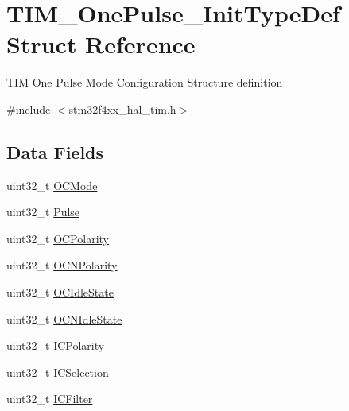 \hypertarget{struct_t_i_m___one_pulse___init_type_def}{}\section{T\+I\+M\+\_\+\+One\+Pulse\+\_\+\+Init\+Type\+Def Struct Reference}
\label{struct_t_i_m___one_pulse___init_type_def}


T\+IM One Pulse Mode Configuration Structure definition ~\newline
  




{\ttfamily \#include $<$stm32f4xx\+\_\+hal\+\_\+tim.\+h$>$}

\subsection*{Data Fields}
\begin{DoxyCompactItemize}
\item 
uint32\+\_\+t \mbox{\hyperlink{struct_t_i_m___one_pulse___init_type_def_add4ac9143086c89effbede5c54e958bf}{O\+C\+Mode}}
\item 
uint32\+\_\+t \mbox{\hyperlink{struct_t_i_m___one_pulse___init_type_def_a5251c3bce4ca5baf013bc0ace0865a4c}{Pulse}}
\item 
uint32\+\_\+t \mbox{\hyperlink{struct_t_i_m___one_pulse___init_type_def_a781c7dae9dec8b6c974b1bdf591b77e7}{O\+C\+Polarity}}
\item 
uint32\+\_\+t \mbox{\hyperlink{struct_t_i_m___one_pulse___init_type_def_a978da9dd7cda80eb5fe8d04828b9bbcc}{O\+C\+N\+Polarity}}
\item 
uint32\+\_\+t \mbox{\hyperlink{struct_t_i_m___one_pulse___init_type_def_a57bb589da3cf2b39b727fe4a3d334ab3}{O\+C\+Idle\+State}}
\item 
uint32\+\_\+t \mbox{\hyperlink{struct_t_i_m___one_pulse___init_type_def_a78d21970d78c1e3e328692743406ba25}{O\+C\+N\+Idle\+State}}
\item 
uint32\+\_\+t \mbox{\hyperlink{struct_t_i_m___one_pulse___init_type_def_a6c0364c24e89f17849b0109236112fba}{I\+C\+Polarity}}
\item 
uint32\+\_\+t \mbox{\hyperlink{struct_t_i_m___one_pulse___init_type_def_a280cec08ad0ea4608ae57523775cc1c0}{I\+C\+Selection}}
\item 
uint32\+\_\+t \mbox{\hyperlink{struct_t_i_m___one_pulse___init_type_def_ab621c1517d5345834fcc71eea97156bf}{I\+C\+Filter}}
\end{DoxyCompactItemize}


